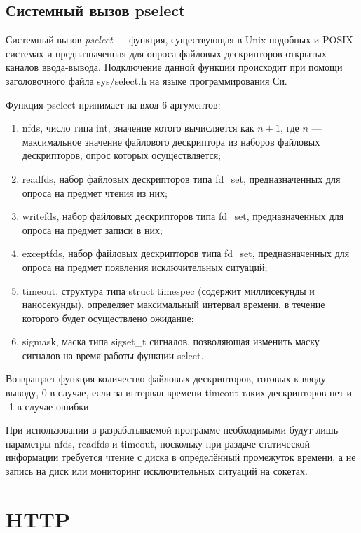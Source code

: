 \subsection{Системный вызов pselect}

Системный вызов \textit{pselect} --- функция, существующая в Unix-подобных и POSIX системах и предназначенная для опроса файловых дескрипторов открытых каналов ввода-вывода. Подключение данной функции происходит при помощи заголовочного файла sys/select.h на языке программирования Си.

Функция pselect принимает на вход 6 аргументов: 

\begin{enumerate}[label=\arabic*)]
	\item nfds, число типа int, значение котого вычисляется как $n + 1$, где $n$ --- максимальное значение файлового дескриптора из наборов файловых дескрипторов, опрос которых осуществляется;
	\item readfds, набор файловых дескрипторов типа fd\_set, предназначенных для опроса на предмет чтения из них;
	\item writefds, набор файловых дескрипторов типа fd\_set, предназначенных для опроса на предмет записи в них;
	\item exceptfds, набор файловых дескрипторов типа fd\_set, предназначенных для опроса на предмет появления исключительных ситуаций;
	\item timeout, структура типа struct timespec (содержит миллисекунды и наносекунды), определяет максимальный интервал времени, в течение которого будет осуществлено ожидание;
	\item sigmask, маска типа sigset\_t сигналов, позволяющая изменить маску сигналов на время работы функции select.
\end{enumerate}

Возвращает функция количество файловых дескрипторов, готовых к вводу-выводу, 0 в случае, если за интервал времени timeout таких дескрипторов нет и -1 в случае ошибки.

При использовании в разрабатываемой программе необходимыми будут лишь параметры nfds, readfds и timeout, поскольку при раздаче статической информации требуется чтение с диска в определённый промежуток времени, а не запись на диск или мониторинг исключительных ситуаций на сокетах.


\section{HTTP}

